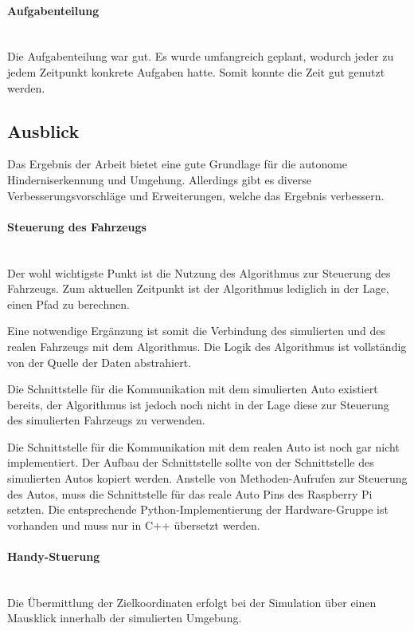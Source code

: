 \paragraph{Aufgabenteilung} \mbox{}\\
Die Aufgabenteilung war gut.
Es wurde umfangreich geplant, wodurch jeder zu jedem Zeitpunkt konkrete Aufgaben hatte.
Somit konnte die Zeit gut genutzt werden.

\subsection{Ausblick}
Das Ergebnis der Arbeit bietet eine gute Grundlage für die autonome Hinderniserkennung und Umgehung.
Allerdings gibt es diverse Verbesserungsvorschläge und Erweiterungen, welche das Ergebnis verbessern.

\paragraph{Steuerung des Fahrzeugs} \mbox{}\\
Der wohl wichtigste Punkt ist die Nutzung des Algorithmus zur Steuerung des Fahrzeugs.
Zum aktuellen Zeitpunkt ist der Algorithmus lediglich in der Lage, einen Pfad zu berechnen.

Eine notwendige Ergänzung ist somit die Verbindung des simulierten und des realen Fahrzeugs mit dem Algorithmus.
Die Logik des Algorithmus ist vollständig von der Quelle der Daten abstrahiert.

Die Schnittstelle für die Kommunikation mit dem simulierten Auto existiert bereits,
der Algorithmus ist jedoch noch nicht in der Lage diese zur Steuerung des simulierten Fahrzeugs zu verwenden.

Die Schnittstelle für die Kommunikation mit dem realen Auto ist noch gar nicht implementiert.
Der Aufbau der Schnittstelle sollte von der Schnittstelle des simulierten Autos kopiert werden.
Anstelle von Methoden-Aufrufen zur Steuerung des Autos, muss die Schnittstelle für das reale Auto Pins des Raspberry Pi setzten.
Die entsprechende Python-Implementierung der Hardware-Gruppe ist vorhanden und muss nur in C++ übersetzt werden.

\paragraph{Handy-Stuerung} \mbox{}\\
Die Übermittlung der Zielkoordinaten erfolgt bei der Simulation über einen Mausklick innerhalb der simulierten Umgebung.


